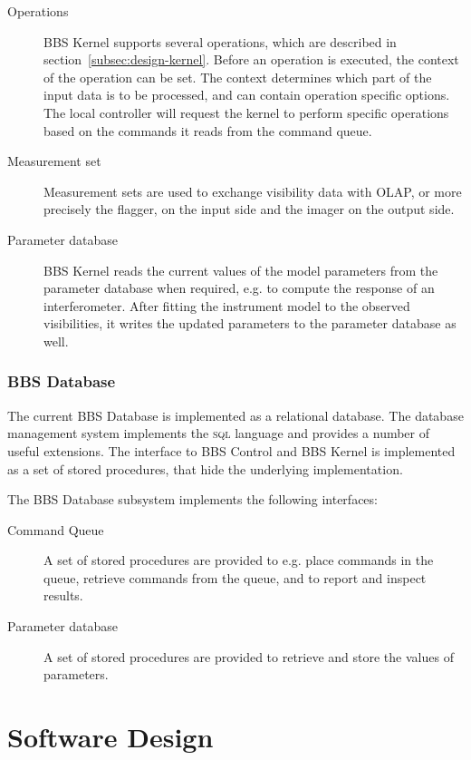 \documentclass[10pt]{lofar}
\newcommand{\olap}{OLAP\xspace}
\begin{document}
\begin{description}
\item [Operations]
BBS Kernel supports several operations, which are described in
section~\ref{subsec:design-kernel}. Before an operation is executed, the context of the
operation can be set. The context determines which part of the input data is to
be processed, and can contain operation specific options. The local controller
will request the kernel to perform specific operations based on the commands it
reads from the command queue.
\item [Measurement set]
Measurement sets are used to exchange visibility data with \olap, or more
precisely the flagger, on the input side and the imager on the output side.
\item [Parameter database]
BBS Kernel reads the current values of the model parameters from the parameter
database when required, e.g. to compute the response of an interferometer. After
fitting the instrument model to the observed visibilities, it writes the updated
parameters to the parameter database as well.
\end{description}

\subsubsection{BBS Database}
\label{subsubsec:interf-database}

The current BBS Database is implemented as a relational database. The database
management system implements the \textsc{sql} language and provides a number of
useful extensions. The interface to BBS Control and BBS Kernel is implemented as
a set of stored procedures, that hide the underlying implementation.

The BBS Database subsystem implements the following interfaces:
\begin{description}
\item [Command Queue]
A set of stored procedures are provided to e.g. place commands in the queue,
retrieve commands from the queue, and to report and inspect results.
\item [Parameter database]
A set of stored procedures are provided to retrieve and store the values of
parameters.
\end{description}

\cleardoublepage

\section{Software Design}
\label{sec:software-design}
\end{document}
